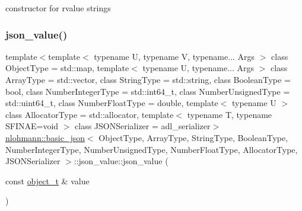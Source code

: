 constructor for rvalue strings 

\mbox{\label{unionnlohmann_1_1basic__json_1_1json__value_a74330ab1bc8ce1d0c6e2ee711c150563}} 
\subsubsection{\texorpdfstring{json\_value()}{json\_value()}\hspace{0.1cm}{\footnotesize\ttfamily [9/12]}}
{\footnotesize\ttfamily template$<$template$<$ typename U, typename V, typename... Args $>$ class Object\+Type = std\+::map, template$<$ typename U, typename... Args $>$ class Array\+Type = std\+::vector, class String\+Type  = std\+::string, class Boolean\+Type  = bool, class Number\+Integer\+Type  = std\+::int64\+\_\+t, class Number\+Unsigned\+Type  = std\+::uint64\+\_\+t, class Number\+Float\+Type  = double, template$<$ typename U $>$ class Allocator\+Type = std\+::allocator, template$<$ typename T, typename S\+F\+I\+N\+A\+E=void $>$ class J\+S\+O\+N\+Serializer = adl\+\_\+serializer$>$ \\
\mbox{\hyperlink{classnlohmann_1_1basic__json}{nlohmann\+::basic\+\_\+json}}$<$ Object\+Type, Array\+Type, String\+Type, Boolean\+Type, Number\+Integer\+Type, Number\+Unsigned\+Type, Number\+Float\+Type, Allocator\+Type, J\+S\+O\+N\+Serializer $>$\+::json\+\_\+value\+::json\+\_\+value (\begin{DoxyParamCaption}\item[{const \mbox{\hyperlink{classnlohmann_1_1basic__json_a5e48a7893520e1314bf0c9723e26ea2a}{object\+\_\+t}} \&}]{value }\end{DoxyParamCaption})\hspace{0.3cm}{\ttfamily [inline]}}



